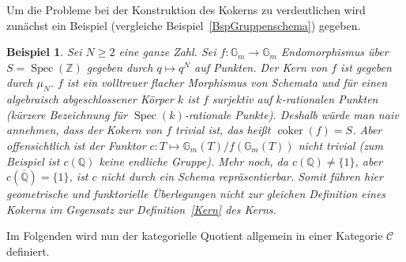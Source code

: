 \documentclass[DIV11,11pt]{scrartcl}
\theoremstyle{Definitionen}
\newtheorem{Bsp}[Def]{Beispiel}
\theoremstyle{Aussagen}
\DeclareMathOperator{\coker}{coker}
\DeclareMathOperator{\Spec}{Spec}
\begin{document}
Um die Probleme bei der Konstruktion des Kokerns zu verdeutlichen wird zunächst ein Beispiel (vergleiche Beispiel~\ref{BspGruppenschema}) gegeben.

\begin{Bsp}\label{BspQuot1}
Sei $N\ge 2$ eine ganze Zahl. Sei $f\colon\mathbb{G}_m\rightarrow\mathbb{G}_m$ Endomorphismus über $S=\Spec(\mathbb{Z})$ gegeben durch $q\mapsto q^N$ auf Punkten. Der Kern von $f$ ist gegeben durch $\mu_N$. $f$ ist ein volltreuer flacher Morphismus von Schemata und für einen algebraisch abgeschlossener Körper $k$ ist $f$ surjektiv auf $k$-rationalen Punkten (kürzere Bezeichnung für $\Spec(k)$-rationale Punkte). Deshalb würde man naiv annehmen, dass der Kokern von $f$ trivial ist, das heißt $\coker(f)=S$. Aber offensichtlich ist der Funktor $c\colon T\mapsto \mathbb{G}_m(T)/f(\mathbb{G}_m(T))$ nicht trivial (zum Beispiel ist $c(\mathbb{Q})$ keine endliche Gruppe). Mehr noch, da $c(\mathbb{Q})\neq\{1\}$, aber $c(\overline{\mathbb{Q}})=\{1\}$, ist $c$ nicht durch ein Schema repräsentierbar. Somit führen hier geometrische und funktorielle Überlegungen nicht zur gleichen Definition eines Kokerns im Gegensatz zur Definition~\ref{Kern} des Kerns.
\end{Bsp}

Im Folgenden wird nun der kategorielle Quotient allgemein in einer Kategorie $\mathcal{C}$ definiert.
\end{document}
